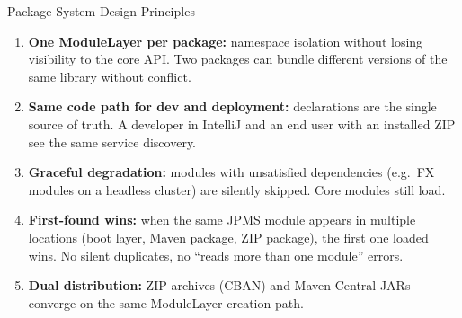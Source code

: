 
\begin{frame}{Package System Design Principles}
\begin{enumerate}
\item \textbf{One ModuleLayer per package:} namespace isolation without losing visibility to the core API. Two packages can bundle different versions of the same library without conflict.

\item \textbf{Same code path for dev and deployment:}   declarations are the single source of truth. A developer in IntelliJ and an end user with an installed ZIP see the same service discovery.

\item \textbf{Graceful degradation:} modules with unsatisfied dependencies (e.g.\ FX modules on a headless cluster) are silently skipped. Core modules still load.

\item \textbf{First-found wins:} when the same JPMS module appears in multiple locations (boot layer, Maven package, ZIP package), the first one loaded wins. No silent duplicates, no ``reads more than one module'' errors.

\item \textbf{Dual distribution:} ZIP archives (CBAN) and Maven Central JARs converge on the same ModuleLayer creation path.
\end{enumerate}
\end{frame}

